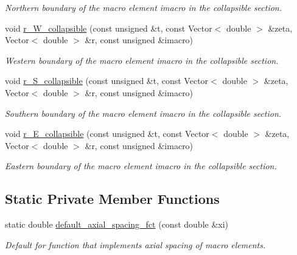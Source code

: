 \begin{DoxyCompactItemize}
\begin{DoxyCompactList}\small\item\em Northern boundary of the macro element imacro in the collapsible section. \end{DoxyCompactList}\item 
void \hyperlink{classoomph_1_1CollapsibleChannelDomain_ab8b0f990e596b2725ca8d84f2c9750eb}{r\+\_\+\+W\+\_\+collapsible} (const unsigned \&t, const Vector$<$ double $>$ \&zeta, Vector$<$ double $>$ \&r, const unsigned \&imacro)
\begin{DoxyCompactList}\small\item\em Western boundary of the macro element imacro in the collapsible section. \end{DoxyCompactList}\item 
void \hyperlink{classoomph_1_1CollapsibleChannelDomain_a1cc35b555f16401ec12854ff5a486800}{r\+\_\+\+S\+\_\+collapsible} (const unsigned \&t, const Vector$<$ double $>$ \&zeta, Vector$<$ double $>$ \&r, const unsigned \&imacro)
\begin{DoxyCompactList}\small\item\em Southern boundary of the macro element imacro in the collapsible section. \end{DoxyCompactList}\item 
void \hyperlink{classoomph_1_1CollapsibleChannelDomain_af684e8e3271ed8f599a02495f794c4e8}{r\+\_\+\+E\+\_\+collapsible} (const unsigned \&t, const Vector$<$ double $>$ \&zeta, Vector$<$ double $>$ \&r, const unsigned \&imacro)
\begin{DoxyCompactList}\small\item\em Eastern boundary of the macro element imacro in the collapsible section. \end{DoxyCompactList}\end{DoxyCompactItemize}
\subsection*{Static Private Member Functions}
\begin{DoxyCompactItemize}
\item 
static double \hyperlink{classoomph_1_1CollapsibleChannelDomain_a3c814ed3312790877d193d4a018c30da}{default\+\_\+axial\+\_\+spacing\+\_\+fct} (const double \&xi)
\begin{DoxyCompactList}\small\item\em Default for function that implements axial spacing of macro elements. \end{DoxyCompactList}\end{DoxyCompactItemize}
